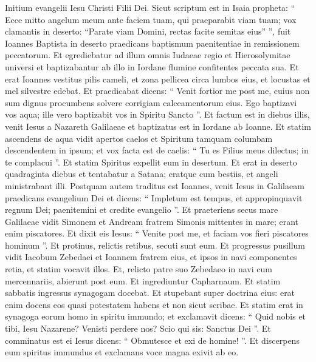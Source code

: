 \begin{biblechapter}
 \verse Initium evangelii Iesu Christi Filii Dei.
 \verse Sicut scriptum est in Isaia propheta:
 “ Ecce mitto angelum meum ante faciem tuam,
 qui praeparabit viam tuam;
 \verse vox clamantis in deserto:
 “Parate viam Domini, rectas facite semitas eius” ”,
 \verse fuit Ioannes Baptista in deserto praedicans baptismum paenitentiae in remissionem peccatorum. 
\verse Et egrediebatur ad illum omnis Iudaeae regio et Hierosolymitae universi et baptizabantur ab illo in Iordane flumine confitentes peccata sua. 
\verse Et erat Ioannes vestitus pilis cameli, et zona pellicea circa lumbos eius, et locustas et mel silvestre edebat.
 \verse Et praedicabat dicens: “ Venit fortior me post me, cuius non sum dignus procumbens solvere corrigiam calceamentorum eius. 
\verse Ego baptizavi vos aqua; ille vero baptizabit vos in Spiritu Sancto ”.
 \verse Et factum est in diebus illis, venit Iesus a Nazareth Galilaeae et baptizatus est in Iordane ab Ioanne. 
\verse Et statim ascendens de aqua vidit apertos caelos et Spiritum tamquam columbam descendentem in ipsum; 
\verse et vox facta est de caelis: “ Tu es Filius meus dilectus; in te complacui ”.
 \verse Et statim Spiritus expellit eum in desertum. 
\verse Et erat in deserto quadraginta diebus et tentabatur a Satana; eratque cum bestiis, et angeli ministrabant illi.
 \verse Postquam autem traditus est Ioannes, venit Iesus in Galilaeam praedicans evangelium Dei 
\verse et dicens: “ Impletum est tempus, et appropinquavit regnum Dei; paenitemini et credite evangelio ”.
 \verse Et praeteriens secus mare Galilaeae vidit Simonem et Andream fratrem Simonis mittentes in mare; erant enim piscatores. 
\verse Et dixit eis Iesus: “ Venite post me, et faciam vos fieri piscatores hominum ”. 
\verse Et protinus, relictis retibus, secuti sunt eum. 
\verse Et progressus pusillum vidit Iacobum Zebedaei et Ioannem fratrem eius, et ipsos in navi componentes retia, 
\verse et statim vocavit illos. Et, relicto patre suo Zebedaeo in navi cum mercennariis, abierunt post eum.
 \verse Et ingrediuntur Capharnaum. Et statim sabbatis ingressus synagogam docebat. 
\verse Et stupebant super doctrina eius: erat enim docens eos quasi potestatem habens et non sicut scribae. 
\verse Et statim erat in synagoga eorum homo in spiritu immundo; et exclamavit 
\verse dicens: “ Quid nobis et tibi, Iesu Nazarene? Venisti perdere nos? Scio qui sis: Sanctus Dei ”. 
\verse Et comminatus est ei Iesus dicens: “ Obmutesce et exi de homine! ”. 
\verse Et discerpens eum spiritus immundus et exclamans voce magna exivit ab eo. 

\end{biblechapter}
